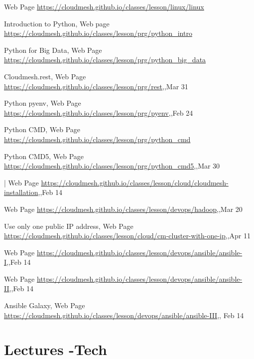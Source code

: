 Web Page \url{https://cloudmesh.github.io/classes/lesson/linux/linux}

Introduction to Python, Web page \url{https://cloudmesh.github.io/classes/lesson/prg/python_intro}

Python for Big Data, Web Page \url{https://cloudmesh.github.io/classes/lesson/prg/python_big_data}


Cloudmesh.rest, Web Page \url{https://cloudmesh.github.io/classes/lesson/prg/rest},,Mar 31     

Python pyenv, Web Page \url{https://cloudmesh.github.io/classes/lesson/prg/pyenv},,Feb 24


Python CMD, Web Page \url{https://cloudmesh.github.io/classes/lesson/prg/python_cmd}

Python CMD5, Web Page \url{https://cloudmesh.github.io/classes/lesson/prg/python_cmd5},,Mar 30


| Web Page \url{https://cloudmesh.github.io/classes/lesson/cloud/cloudmesh-installation},,Feb 14


Web Page \url{https://cloudmesh.github.io/classes/lesson/devops/hadoop},,Mar 20

Use only one public IP address, Web Page \url{https://cloudmesh.github.io/classes/lesson/cloud/cm-cluster-with-one-ip},,Apr 11


Web Page \url{https://cloudmesh.github.io/classes/lesson/devops/ansible/ansible-I},,Feb 14


Web Page \url{https://cloudmesh.github.io/classes/lesson/devops/ansible/ansible-II},,Feb 14

Ansible Galaxy, Web Page \url{https://cloudmesh.github.io/classes/lesson/devops/ansible/ansible-III},, Feb 14


\section{Lectures -Tech}

